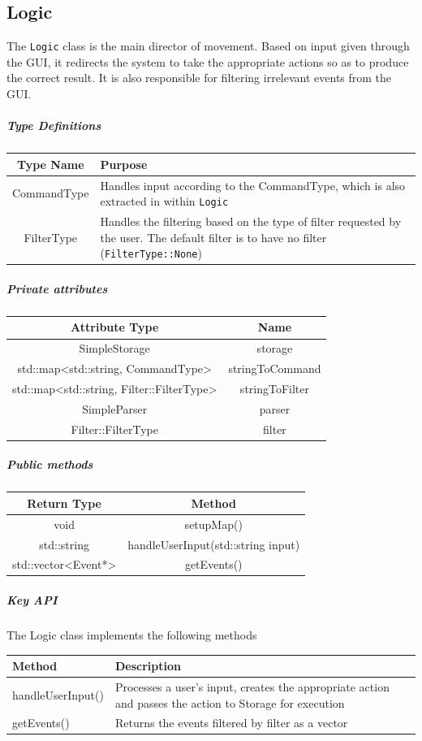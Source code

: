 \documentclass[12pt]{extarticle}
\begin{document}
\subsection{Logic}
The \texttt{Logic} class is the main director of movement. Based on input given through the GUI, it redirects the system to take the appropriate actions so as to produce the correct result. It is also responsible for filtering irrelevant events from the GUI.
\subparagraph{Type Definitions}
\begin{tabular}{c p{9.5cm}}
Type Name & Purpose\\
\hline
CommandType & Handles input according to the CommandType, which is also extracted in within \texttt{Logic}\\
FilterType & Handles the filtering based on the type of filter requested by the user. The default filter is to have no filter (\texttt{FilterType::None})
\end{tabular}
\subparagraph{Private attributes}
\begin{tabular}{c c}
Attribute Type & Name\\
\hline
SimpleStorage & storage\\
std::map<std::string, CommandType> & stringToCommand\\
std::map<std::string, Filter::FilterType> & stringToFilter\\
SimpleParser & parser\\
Filter::FilterType & filter\\
\end{tabular}
\subparagraph{Public methods}
\begin{tabular}{c c}
Return Type & Method\\
\hline
void & setupMap()\\
std::string & handleUserInput(std::string input)\\
std::vector<Event*> & getEvents()\\
\end{tabular}
\subparagraph{Key API}
The Logic class implements the following methods\\
\begin{tabular}{p{6cm} p{12cm}}
Method & Description\\
\hline
handleUserInput() & Processes a user's input, creates the appropriate action and passes the action to Storage for execution\\
getEvents() & Returns the events filtered by filter as a vector\\
\end{tabular}
\end{document}
